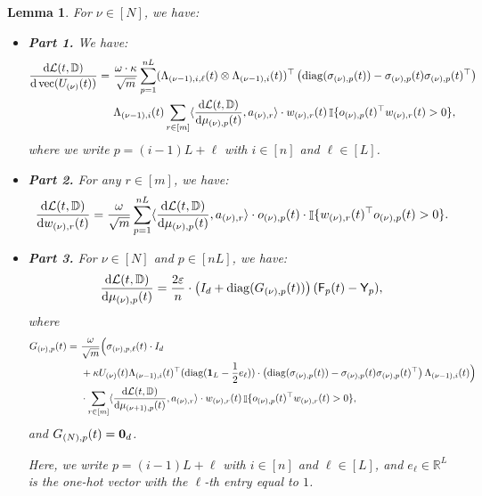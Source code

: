 \documentclass[11pt]{article}
\theoremstyle{plain}
\newtheorem{lemma}[theorem]{Lemma}
\newcommand{\R}{\mathbb{R}}
\renewcommand{\d}{\mathrm{d}}
\DeclareMathOperator{\I}{\mathbb{I}}
\DeclareMathOperator{\diag}{diag}
\DeclareMathOperator{\vect}{vec}
\begin{document}
\begin{lemma}\label{lem:grad_computation}
    For $\nu \in [N]$, we have:
    \begin{itemize}
        \item {\bf Part 1.} We have:
        \begin{align*}
            \frac{\d{\cal L}(t, \mathbb{D}) }{\d \vect(U_{(\nu)}(t))}
            = & ~ \frac{\omega \cdot \kappa}{\sqrt{m}} \sum_{p=1}^{nL} (\Lambda_{(\nu-1), i, \ell}(t) \otimes \Lambda_{(\nu-1), i}(t))^\top \left(\diag(\sigma_{(\nu), p}(t)) - \sigma_{(\nu), p}(t)\sigma_{(\nu), p}(t)^\top\right) \\
            & ~ \Lambda_{(\nu-1), i }(t) \sum_{r\in [m]} \langle \frac{\d {\cal L}(t, \mathbb{D}) }{\d \mu_{(\nu), p}(t)}, a_{(\nu), r} \rangle \cdot w_{(\nu), r}(t) \I\{ o_{(\nu), p}(t)^\top w_{(\nu), r}(t) > 0\},
        \end{align*}
        where we write $p = (i-1)L + \ell$ with $i \in [n]$ and $\ell \in [L]$.
        \item {\bf Part 2.} For any $r \in [m]$, we have:
        \begin{align*}
            \frac{\d {\cal L}(t, \mathbb{D}) }{\d w_{(\nu), r}(t)} = \frac{\omega}{\sqrt{m}}   \sum_{p=1}^{nL} \langle \frac{\d {\cal L}(t, \mathbb{D}) }{\d \mu_{(\nu), p}(t)}, a_{(\nu), r} \rangle \cdot o_{(\nu), p}(t) \cdot \I\{w_{(\nu), r}(t)^\top o_{(\nu), p}(t) > 0\} .
        \end{align*}
        \item {\bf Part 3.} For $\nu \in [N]$ and $p \in [nL]$, we have:
        \begin{align*}
            \frac{\d {\cal L}(t, \mathbb{D}) }{\d \mu_{(\nu), p}(t)} = \frac{2\varepsilon}{n} \cdot \left(I_d + \diag(G_{(\nu), p}(t))\right) ({\sf F}_p(t) - {\sf Y}_p),
        \end{align*}
        where 
        \begin{align*}
            G_{(\nu), p}(t) = & ~  \frac{\omega}{\sqrt{m}} \Big(\sigma_{(\nu), p, \ell}(t) \cdot I_d \\
            & ~ +  \kappa U_{(\nu)}(t)\Lambda_{(\nu-1), i }(t)^\top ( \diag({\bf 1}_L - \frac{1}{2}e_{\ell}) ) \cdot \left(\diag(\sigma_{(\nu), p}(t)) - \sigma_{(\nu), p}(t)\sigma_{(\nu), p}(t)^\top\right)\Lambda_{(\nu-1), i }(t) \Big) \\
            &  ~ \cdot \sum_{r\in [m]} \langle \frac{\d {\cal L}(t, \mathbb{D}) }{\d \mu_{(\nu+1), p}(t)}, a_{(\nu), r} \rangle \cdot w_{(\nu), r}(t) \I\{ o_{(\nu), p}(t)^\top w_{(\nu), r}(t) > 0\},
        \end{align*}
        and $G_{(N), p}(t) = {\bf 0}_d$.
        
        Here, we write $p = (i-1)L + \ell$ with $i \in [n]$ and $\ell \in [L]$, and $e_\ell \in \R^L$ is the one-hot vector with the $\ell$-th entry equal to $1$.
    \end{itemize}
\end{lemma}
\end{document}
